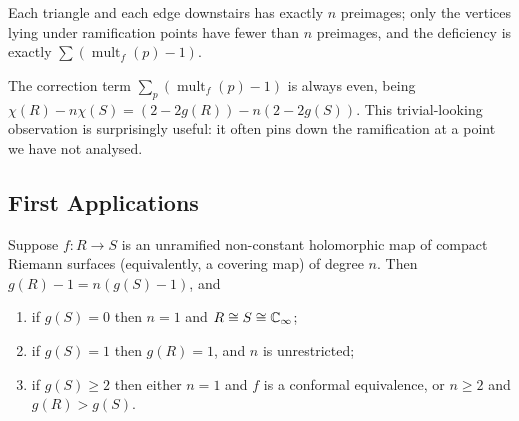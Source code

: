 \documentclass[a4paper]{scrartcl}
\newcommand{\Cinf}{\C_\infty}
\newcommand{\mult}{\operatorname{mult}}
\begin{document}
\begin{center}
\end{center}

Each triangle and each edge downstairs has exactly $n$ preimages; only the vertices lying
under ramification points have fewer than $n$ preimages, and the deficiency is exactly
$\sum(\mult_f(p)-1)$.

\begin{remark}	The correction term $\sum_p (\mult_f(p)-1)$ is always even, being
	$\chi(R) - n\chi(S) = (2-2g(R)) - n(2 - 2g(S))$. This trivial-looking observation is
	surprisingly useful: it often pins down the ramification at a point we have not
	analysed.
\end{remark}

\subsection{First Applications}

\begin{corollary}\label{cor:unramified}
	Suppose $f : R \to S$ is an unramified non-constant holomorphic map of compact Riemann
	surfaces (equivalently, a covering map) of degree $n$. Then $g(R) - 1 = n(g(S)-1)$, and
	\begin{enumerate}[label=(\roman*)]
		\item if $g(S) = 0$ then $n = 1$ and $R \cong S \cong \Cinf$;
		\item if $g(S) = 1$ then $g(R) = 1$, and $n$ is unrestricted;
		\item if $g(S) \geq 2$ then either $n = 1$ and $f$ is a conformal equivalence, or
		$n \geq 2$ and $g(R) > g(S)$.
	\end{enumerate}
\end{corollary}
\end{document}
